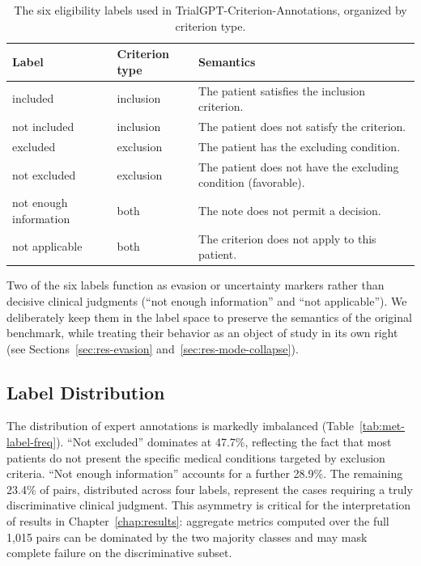 \begin{table}[htbp]
    \centering
    \caption{The six eligibility labels used in TrialGPT-Criterion-Annotations,
        organized by criterion type.}
    \label{tab:met-labels}
    \small
    \begin{tabular}{@{}p{2.5cm}p{2.5cm}p{7cm}@{}}
        \toprule
        \textbf{Label} & \textbf{Criterion type} & \textbf{Semantics} \\
        \midrule
        included & inclusion & The patient satisfies the inclusion criterion. \\
        not included & inclusion & The patient does not satisfy the criterion. \\
        excluded & exclusion & The patient has the excluding condition. \\
        not excluded & exclusion & The patient does not have the excluding condition (favorable). \\
        not enough information & both & The note does not permit a decision. \\
        not applicable & both & The criterion does not apply to this patient. \\
        \bottomrule
    \end{tabular}
\end{table}

Two of the six labels function as evasion or uncertainty markers rather than 
decisive clinical judgments (``not enough information'' and 
``not applicable''). We deliberately keep them in the label space to preserve 
the semantics of the original benchmark, while treating their behavior as an 
object of study in its own right (see Sections~\ref{sec:res-evasion} 
and~\ref{sec:res-mode-collapse}).

\subsection{Label Distribution}
\label{subsec:met-data-distribution}

The distribution of expert annotations is markedly imbalanced 
(Table~\ref{tab:met-label-freq}). ``Not excluded'' dominates at 47.7\%, 
reflecting the fact that most patients do not present the specific medical 
conditions targeted by exclusion criteria. ``Not enough information'' 
accounts for a further 28.9\%. The remaining 23.4\% of pairs, distributed 
across four labels, represent the cases requiring a truly discriminative 
clinical judgment. This asymmetry is critical for the interpretation of 
results in Chapter~\ref{chap:results}: aggregate metrics computed over the 
full 1{,}015 pairs can be dominated by the two majority classes and may 
mask complete failure on the discriminative subset.

